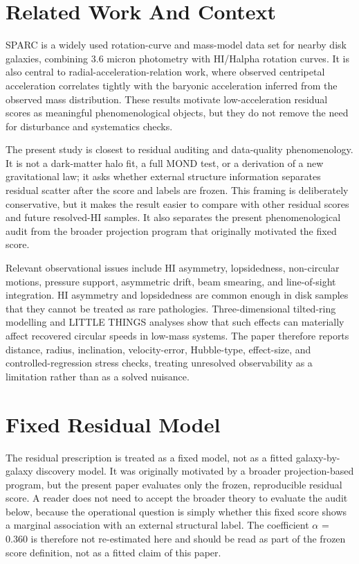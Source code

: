 \documentclass[11pt]{article}
\begin{document}
\section{Related Work And Context}
SPARC is a widely used rotation-curve and mass-model data set for nearby disk galaxies, combining 3.6 micron photometry with HI/Halpha rotation curves. It is also central to radial-acceleration-relation work, where observed centripetal acceleration correlates tightly with the baryonic acceleration inferred from the observed mass distribution. These results motivate low-acceleration residual scores as meaningful phenomenological objects, but they do not remove the need for disturbance and systematics checks.

The present study is closest to residual auditing and data-quality phenomenology. It is not a dark-matter halo fit, a full MOND test, or a derivation of a new gravitational law; it asks whether external structure information separates residual scatter after the score and labels are frozen. This framing is deliberately conservative, but it makes the result easier to compare with other residual scores and future resolved-HI samples. It also separates the present phenomenological audit from the broader projection program that originally motivated the fixed score.

Relevant observational issues include HI asymmetry, lopsidedness, non-circular motions, pressure support, asymmetric drift, beam smearing, and line-of-sight integration. HI asymmetry and lopsidedness are common enough in disk samples that they cannot be treated as rare pathologies. Three-dimensional tilted-ring modelling and LITTLE THINGS analyses show that such effects can materially affect recovered circular speeds in low-mass systems. The paper therefore reports distance, radius, inclination, velocity-error, Hubble-type, effect-size, and controlled-regression stress checks, treating unresolved observability as a limitation rather than as a solved nuisance.

\section{Fixed Residual Model}
The residual prescription is treated as a fixed model, not as a fitted galaxy-by-galaxy discovery model. It was originally motivated by a broader projection-based program, but the present paper evaluates only the frozen, reproducible residual score. A reader does not need to accept the broader theory to evaluate the audit below, because the operational question is simply whether this fixed score shows a marginal association with an external structural label. The coefficient $\alpha$ = 0.360 is therefore not re-estimated here and should be read as part of the frozen score definition, not as a fitted claim of this paper.
\end{document}
